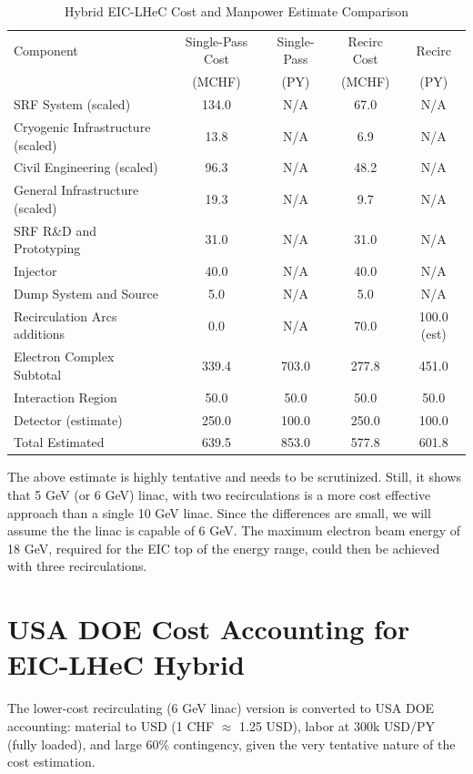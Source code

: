 \documentclass{article}
\begin{document}
\begin{longtable}{lcccc}
\caption{Hybrid EIC-LHeC Cost and Manpower Estimate Comparison} \\
\toprule
Component & Single-Pass Cost  & Single-Pass  & Recirc Cost  & Recirc  \\
    &  (MCHF) &  (PY) &  (MCHF) &  (PY) \\
\midrule
SRF System (scaled) & 134.0 & N/A & 67.0 & N/A \\
Cryogenic Infrastructure (scaled) & 13.8 & N/A & 6.9 & N/A \\
Civil Engineering (scaled) & 96.3 & N/A & 48.2 & N/A \\
General Infrastructure (scaled) & 19.3 & N/A & 9.7 & N/A \\
SRF R\&D and Prototyping & 31.0 & N/A & 31.0 & N/A \\
Injector & 40.0 & N/A & 40.0 & N/A \\
Dump System and Source & 5.0 & N/A & 5.0 & N/A \\
Recirculation Arcs additions & 0.0 & N/A & 70.0 & 100.0 (est) \\
Electron Complex Subtotal & 339.4 & 703.0 & 277.8 & 451.0 \\
Interaction Region & 50.0 & 50.0 & 50.0 & 50.0 \\
Detector (estimate) & 250.0 & 100.0 & 250.0 & 100.0 \\
\bottomrule
Total Estimated & 639.5 & 853.0 & 577.8 & 601.8 \\
\bottomrule
\end{longtable}

The above estimate is highly tentative and needs to be scrutinized. Still, it shows that 5 GeV (or 6 GeV) linac, with two recirculations is a more cost effective approach than a single 10 GeV linac. Since the differences are small, we will assume the the linac is capable of 6 GeV. The maximum electron beam energy of 18 GeV, required for the EIC top of the energy range, could then be achieved with three recirculations.   

\section{USA DOE Cost Accounting for EIC-LHeC Hybrid}

The lower-cost recirculating (6 GeV linac) version is converted to USA DOE accounting: material to USD (1 CHF $\approx$ 1.25 USD), labor at 300k USD/PY (fully loaded), and large 60\% contingency, given the very tentative nature of the cost estimation. 
\end{document}
